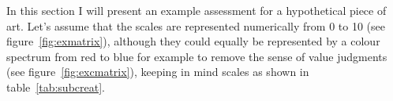 In this section I will present an example assessment for a hypothetical piece of art. Let's assume that the scales are represented numerically from 0 to 10 (see figure~\ref{fig:exmatrix}), although they could equally be represented by a colour spectrum from red to blue for example to remove the sense of value judgments (see figure~\ref{fig:excmatrix}), keeping in mind scales as shown in table~\ref{tab:subcreat}. 





